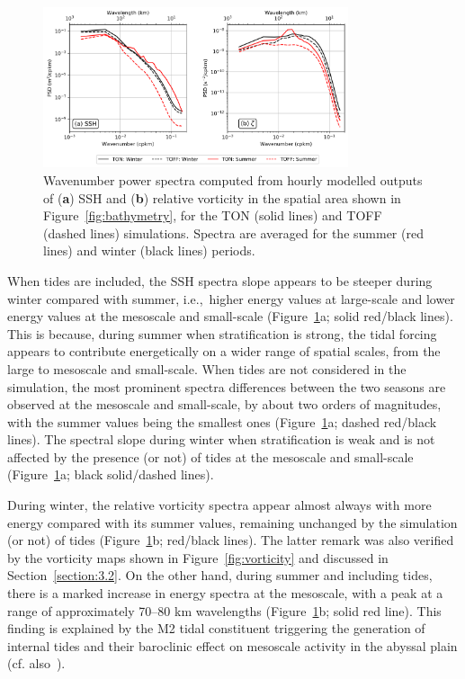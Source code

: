 \documentclass[jmse,article,accept,moreauthors,pdftex]{Definitions/mdpi}
\begin{document}
\begin{figure}[H]
    \centering
    \includegraphics[width=0.8\textwidth]{Definitions/figure12.png}
    \caption{Wavenumber power spectra computed from hourly modelled outputs of (\textbf{a}) SSH and (\textbf{b}) relative vorticity in the spatial area shown in Figure~\ref{fig:bathymetry}, for the TON (solid lines) and TOFF (dashed lines) simulations. Spectra are averaged for the summer (red lines) and winter (black lines) periods.}
    \label{fig:wavenumber_spectra}
\end{figure}

When tides are included, the SSH spectra slope appears to be steeper during winter compared with summer, i.e.,~higher energy values at large-scale and lower energy values at the mesoscale and small-scale (Figure~\ref{fig:wavenumber_spectra}a; solid red/black lines). This is because, during summer when stratification is strong, the tidal forcing appears to contribute energetically on a wider range of spatial scales, from the large to mesoscale and small-scale. When tides are not considered in the simulation, the most prominent spectra differences between the two seasons are observed at the mesoscale and small-scale, by about two orders of magnitudes, with the summer values being the smallest ones (Figure~\ref{fig:wavenumber_spectra}a; dashed red/black lines). The spectral slope during winter when stratification is weak and is not affected by the presence (or not) of tides at the mesoscale and small-scale (Figure~\ref{fig:wavenumber_spectra}a; black solid/dashed lines).

During winter, the relative vorticity spectra appear almost always with more energy compared with its summer values, remaining unchanged by the simulation (or not) of tides (Figure~\ref{fig:wavenumber_spectra}b; red/black lines). The latter remark was also verified by the vorticity maps shown in Figure~\ref{fig:vorticity} and discussed in Section~\ref{section:3.2}. On the other hand, during summer and including tides, there is a marked increase in energy spectra at the mesoscale, with a peak at a range of approximately 70{--}80 km wavelengths (Figure~\ref{fig:wavenumber_spectra}b; solid red line). This finding is explained by the M2 tidal constituent triggering the generation of internal tides and their baroclinic effect on mesoscale activity in the abyssal plain (cf. also~\cite{Pairaud2010}).
\end{document}

